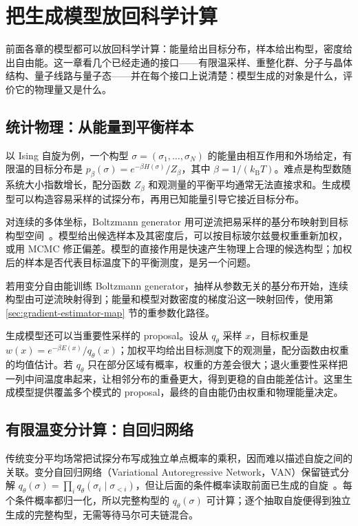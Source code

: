 \chapter{把生成模型放回科学计算}
\label{chap:science}

\begin{keybox}[把分布问题换回物理问题]
前面各章的模型都可以放回科学计算：能量给出目标分布，样本给出构型，密度给出自由能。这一章看几个已经走通的接口——有限温采样、重整化群、分子与晶体结构、量子线路与量子态——并在每个接口上说清楚：模型生成的对象是什么，评价它的物理量又是什么。
\end{keybox}

\section{统计物理：从能量到平衡样本}

以 Ising 自旋为例，一个构型 \(\sigma=(\sigma_1,\ldots,\sigma_N)\) 的能量由相互作用和外场给定，有限温的目标分布是 \(p_\beta(\sigma)=e^{-\beta H(\sigma)}/Z_\beta\)，其中 \(\beta=1/(k_{\mathrm B}T)\)。难点是构型数随系统大小指数增长，配分函数 \(Z_\beta\) 和观测量的平衡平均通常无法直接求和。生成模型可以构造容易采样的试探分布，再用已知能量引导它接近目标分布。

对连续的多体坐标，Boltzmann generator 用可逆流把易采样的基分布映射到目标构型空间~\cite{kim2019boltzmann}。模型给出候选样本及其密度后，可以按目标玻尔兹曼权重重新加权，或用 MCMC 修正偏差。模型的直接作用是快速产生物理上合理的候选构型；加权后的样本是否代表目标温度下的平衡测度，是另一个问题。

若用变分自由能训练 Boltzmann generator，抽样从参数无关的基分布开始，连续构型由可逆流映射得到；能量和模型对数密度的梯度沿这一映射回传，使用第 \ref{sec:gradient-estimator-map} 节的重参数化路径。

生成模型还可以当重要性采样的 proposal。设从 \(q_\theta\) 采样 \(x\)，目标权重是 \(w(x)=e^{-\beta E(x)}/q_\theta(x)\)；加权平均给出目标测度下的观测量，配分函数由权重的均值估计。若 \(q_\theta\) 只在部分区域有概率，权重的方差会很大；退火重要性采样把一列中间温度串起来，让相邻分布的重叠更大，得到更稳的自由能差估计。这里生成模型提供覆盖多个模式的 proposal，最终的自由能仍由权重和物理能量决定。

\section{有限温变分计算：自回归网络}

传统变分平均场常把试探分布写成独立单点概率的乘积，因而难以描述自旋之间的关联。变分自回归网络（Variational Autoregressive Network，VAN）保留链式分解 \(q_\theta(\sigma)=\prod_i q_\theta(\sigma_i\mid\sigma_{<i})\)，但让后面的条件概率读取前面已生成的自旋~\cite{wu2019variational}。每个条件概率都归一化，所以完整构型的 \(q_\theta(\sigma)\) 可计算；逐个抽取自旋便得到独立生成的完整构型，无需等待马尔可夫链混合。

